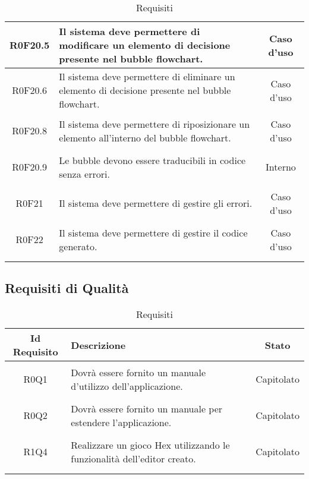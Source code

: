 \documentclass[../AnalisiDeiRequisiti.tex]{subfiles}
\begin{document}
\begin{longtable}{|c|>{\centering}p{7cm}|c|}
\hypertarget{R0F20.5}{R0F20.5} & Il sistema deve permettere di modificare un elemento di decisione presente nel bubble flowchart. & Caso d'uso \\ \hline
\hypertarget{R0F20.6}{R0F20.6} & Il sistema deve permettere di eliminare un elemento di decisione presente nel bubble flowchart. & Caso d'uso \\ \hline
\hypertarget{R0F20.8}{R0F20.8} & Il sistema deve permettere di riposizionare un elemento all'interno del bubble flowchart. & Caso d'uso \\ \hline
\hypertarget{R0F20.9}{R0F20.9} & Le bubble devono essere traducibili in codice senza errori. & Interno \\ \hline
\hypertarget{R0F21}{R0F21} & Il sistema deve permettere di gestire gli errori. & Caso d'uso \\ \hline
\hypertarget{R0F22}{R0F22} & Il sistema deve permettere di gestire il codice generato. & Caso d'uso \\ \hline
\caption[Requisiti]{Requisiti}
\label{tabella:req0}
\end{longtable}
\clearpage
\subsection{Requisiti di Qualità}
\normalsize
\begin{longtable}{|c|>{\centering}p{7cm}|c|}
	\hline
	\textbf{Id Requisito} & \textbf{Descrizione} & \textbf{Stato}\\
	\hline
	\endhead
	\hypertarget{R0Q1}{R0Q1} & Dovrà essere fornito un manuale d'utilizzo dell'applicazione. & Capitolato \\ \hline
	\hypertarget{R0Q2}{R0Q2} & Dovrà essere fornito un manuale per estendere l'applicazione. & Capitolato \\ \hline
	\hypertarget{R1Q4}{R1Q4} & Realizzare un gioco Hex utilizzando le funzionalità dell'editor creato. & Capitolato \\ \hline
	\caption[Requisiti]{Requisiti}
	\label{tabella:req1}
\end{longtable}
\clearpage
\end{document}
